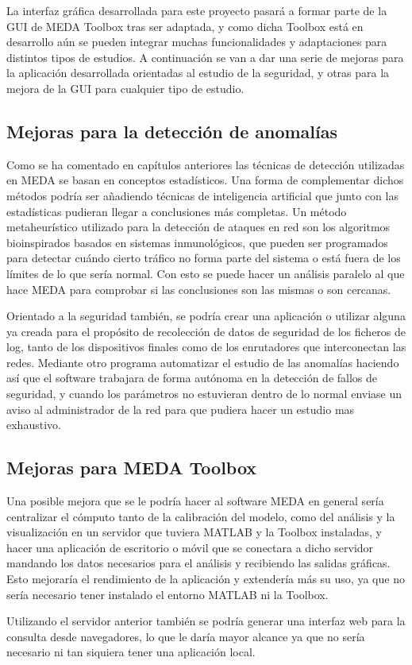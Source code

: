 La interfaz gráfica desarrollada para este proyecto pasará a formar parte de la GUI de MEDA Toolbox tras ser adaptada, y como dicha Toolbox está en desarrollo aún se pueden integrar muchas funcionalidades y adaptaciones para distintos tipos de estudios. A continuación se van a dar una serie de mejoras para la aplicación desarrollada orientadas al estudio de la seguridad, y otras para la mejora de la GUI para cualquier tipo de estudio.

\bigskip

\subsection{Mejoras para la detección de anomalías}

Como se ha comentado en capítulos anteriores las técnicas de detección utilizadas en MEDA se basan en conceptos estadísticos. Una forma de complementar dichos métodos podría ser añadiendo técnicas de inteligencia artificial que junto con las estadísticas pudieran llegar a conclusiones más completas. Un método metaheurístico utilizado para la detección de ataques en red son los algoritmos bioinspirados  basados en sistemas inmunológicos, que pueden ser programados para detectar cuándo cierto tráfico no forma parte del sistema o está fuera de los límites de lo que sería normal. Con esto se puede hacer un análisis paralelo al que hace MEDA para comprobar si las conclusiones son las mismas o son cercanas.

\bigskip

Orientado a la seguridad también, se podría crear una aplicación o utilizar alguna ya creada para el propósito de recolección de datos de seguridad de los ficheros de log, tanto de los dispositivos finales como de los enrutadores que interconectan las redes. Mediante otro programa automatizar el estudio de las anomalías haciendo así que el software trabajara de forma autónoma en la detección de fallos de seguridad, y cuando los parámetros no estuvieran dentro de lo normal enviase un aviso al administrador de la red para que pudiera hacer un estudio mas exhaustivo.

\bigskip

\subsection{Mejoras para MEDA Toolbox}

Una posible mejora que se le podría hacer al software MEDA en general sería centralizar el cómputo tanto de la calibración del modelo, como del análisis y la visualización en un servidor que tuviera MATLAB y la Toolbox instaladas, y hacer una aplicación de escritorio o móvil que se conectara a dicho servidor mandando los datos necesarios para el análisis y recibiendo las salidas gráficas. Esto mejoraría el rendimiento de la aplicación y extendería más su uso, ya que no sería necesario tener instalado el entorno MATLAB ni la Toolbox.

\bigskip

Utilizando el servidor anterior también se podría generar una interfaz web para la consulta desde navegadores, lo que le daría mayor alcance ya que no sería necesario ni tan siquiera tener una aplicación local.



